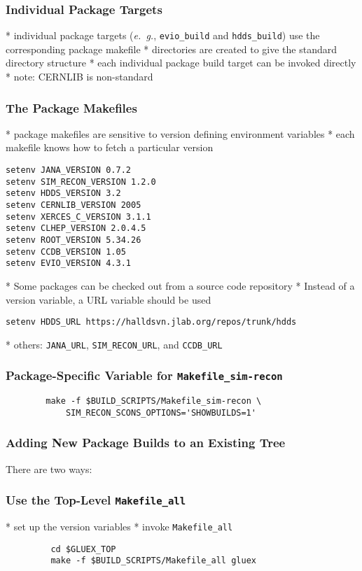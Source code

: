 \documentclass[xcolor=dvipsnames,hyperref={pdfpagelabels=false}]{beamer}
\begin{document}
\begin{frame}\frametitle{Individual Package Targets}

* individual package targets ({\it e.~g.}, {\tt evio\_build}
and {\tt hdds\_build}) use the corresponding package makefile
* directories are created to give the standard directory structure
* each individual package build target can be invoked directly
* note: CERNLIB is non-standard

\end{frame}\begin{frame}[fragile]
  \frametitle{The Package Makefiles}\label{section:package-makefiles}

* package makefiles are sensitive to version defining environment variables
* each makefile knows how to fetch a particular version

\begin{verbatim}
setenv JANA_VERSION 0.7.2
setenv SIM_RECON_VERSION 1.2.0
setenv HDDS_VERSION 3.2
setenv CERNLIB_VERSION 2005
setenv XERCES_C_VERSION 3.1.1
setenv CLHEP_VERSION 2.0.4.5
setenv ROOT_VERSION 5.34.26
setenv CCDB_VERSION 1.05
setenv EVIO_VERSION 4.3.1
\end{verbatim}

* Some packages can be checked out from a source code repository
* Instead of a version variable, a URL variable should be used

\begin{verbatim}
setenv HDDS_URL https://halldsvn.jlab.org/repos/trunk/hdds
\end{verbatim}

* others: {\tt JANA\_URL}, {\tt SIM\_RECON\_URL}, and {\tt CCDB\_URL}

\end{frame}
\begin{frame}[fragile]
  \frametitle{Package-Specific Variable for {\tt Makefile\_sim-recon}}

\begin{verbatim}
        make -f $BUILD_SCRIPTS/Makefile_sim-recon \
            SIM_RECON_SCONS_OPTIONS='SHOWBUILDS=1'
\end{verbatim}

\end{frame}
\begin{frame}\frametitle{Adding New Package Builds to an Existing Tree}\label{section:adding-packages}

There are two ways:

\end{frame}
\begin{frame}[fragile]\frametitle{Use the Top-Level {\tt Makefile\_all}}

* set up the version variables
* invoke {\tt Makefile\_all}

\begin{verbatim}
         cd $GLUEX_TOP
         make -f $BUILD_SCRIPTS/Makefile_all gluex
\end{verbatim}

\end{frame}
\end{document}

